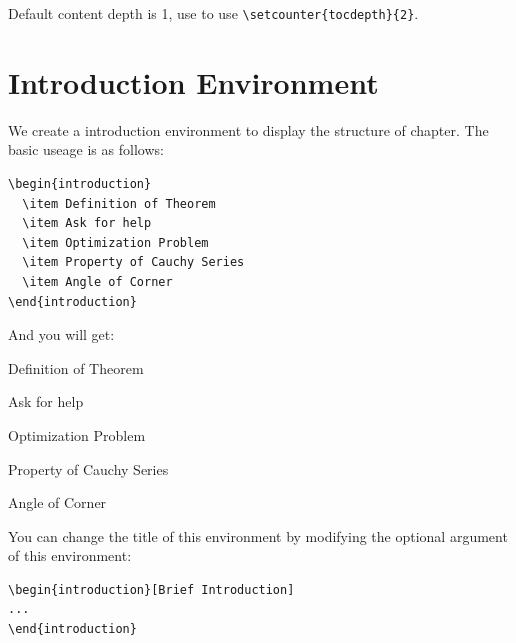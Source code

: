 \documentclass[11pt]{elegantbook}
\begin{document}
Default content depth is 1, use to use \lstinline|\setcounter{tocdepth}{2}|.

\section{Introduction Environment}
We create a introduction environment to display the structure of chapter. The basic useage is as follows:
\begin{lstlisting}
\begin{introduction}
  \item Definition of Theorem
  \item Ask for help
  \item Optimization Problem
  \item Property of Cauchy Series
  \item Angle of Corner
\end{introduction}
\end{lstlisting}
And you will get:
\begin{introduction}
  \item Definition of Theorem
  \item Ask for help
  \item Optimization Problem
  \item Property of Cauchy Series
  \item Angle of Corner
\end{introduction}

You can change the title of this environment by modifying the optional argument of this environment:
\begin{lstlisting}
\begin{introduction}[Brief Introduction]
...
\end{introduction}
\end{lstlisting}
\end{document}
